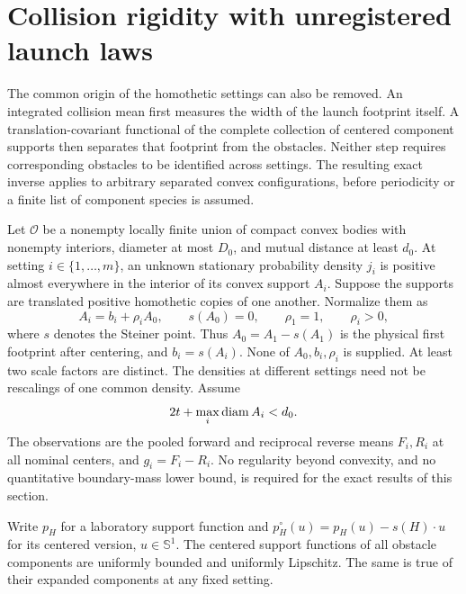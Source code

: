 \section{Collision rigidity with unregistered launch laws}
\label{sec:unregistered-laws}
The common origin of the homothetic settings can also be removed.
An integrated collision mean first measures the width of the launch
footprint itself. A translation-covariant functional of the complete
collection of centered component supports then separates that footprint
from the obstacles. Neither step requires corresponding obstacles to
be identified across settings. The resulting exact inverse applies to
arbitrary separated convex configurations, before periodicity or a
finite list of component species is assumed.

Let $\mathcal O$ be a nonempty locally finite union of compact convex
bodies with nonempty interiors, diameter at most $D_0$, and mutual
distance at least $d_0$. At setting $i\in\{1,\ldots,m\}$, an unknown
stationary probability density $j_i$ is positive almost everywhere in
the interior of its convex support $A_i$. Suppose the supports are
translated positive homothetic copies of one another. Normalize them as
\begin{equation}\label{eq:registration-model}
 A_i=b_i+\rho_i A_0,\qquad s(A_0)=0,\qquad
 \rho_1=1,\qquad \rho_i>0,
\end{equation}
where $s$ denotes the Steiner point. Thus $A_0=A_1-s(A_1)$ is the
physical first footprint after centering, and $b_i=s(A_i)$. None of
$A_0,b_i,\rho_i$ is supplied. At least two scale factors are distinct.
The densities at different settings need not be rescalings of one
common density. Assume
\begin{equation}\label{eq:registration-separation}
                    2t+\max_i\operatorname{diam} A_i<d_0.
\end{equation}
The observations are the pooled forward and reciprocal reverse means
$F_i,R_i$ at all nominal centers, and $g_i=F_i-R_i$. No regularity
beyond convexity, and no quantitative boundary-mass lower bound, is
required for the exact results of this section.

Write $p_H$ for a laboratory support function and
$p_H^\circ(u)=p_H(u)-s(H)\cdot u$ for its centered version,
$u\in\mathbb S^1$. The centered support functions of all obstacle
components are uniformly bounded and uniformly Lipschitz. The same
is true of their expanded components at any fixed setting.

